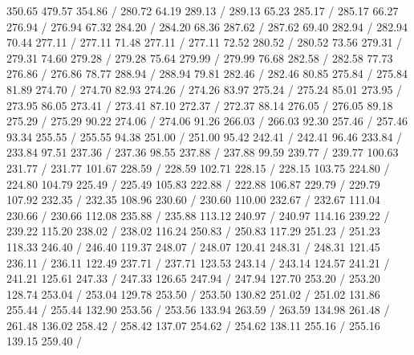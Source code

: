 { 350.65 479.57 354.86 /
\setsolid
{} 280.72 64.19 289.13 /
 289.13 65.23 285.17 /
 285.17 66.27 276.94 /
 276.94 67.32 284.20 /
 284.20 68.36 287.62 /
 287.62 69.40 282.94 /
 282.94 70.44 277.11 /
 277.11 71.48 277.11 /
 277.11 72.52 280.52 /
 280.52 73.56 279.31 /
 279.31 74.60 279.28 /
 279.28 75.64 279.99 /
 279.99 76.68 282.58 /
 282.58 77.73 276.86 /
 276.86 78.77 288.94 /
 288.94 79.81 282.46 /
 282.46 80.85 275.84 /
 275.84 81.89 274.70 /
 274.70 82.93 274.26 /
 274.26 83.97 275.24 /
 275.24 85.01 273.95 /
 273.95 86.05 273.41 /
 273.41 87.10 272.37 /
 272.37 88.14 276.05 /
 276.05 89.18 275.29 /
 275.29 90.22 274.06 /
 274.06 91.26 266.03 /
 266.03 92.30 257.46 /
 257.46 93.34 255.55 /
 255.55 94.38 251.00 /
 251.00 95.42 242.41 /
 242.41 96.46 233.84 /
 233.84 97.51 237.36 /
 237.36 98.55 237.88 /
 237.88 99.59 239.77 /
 239.77 100.63 231.77 /
 231.77 101.67 228.59 /
 228.59 102.71 228.15 /
 228.15 103.75 224.80 /
 224.80 104.79 225.49 /
 225.49 105.83 222.88 /
 222.88 106.87 229.79 /
 229.79 107.92 232.35 /
 232.35 108.96 230.60 /
 230.60 110.00 232.67 /
 232.67 111.04 230.66 /
 230.66 112.08 235.88 /
 235.88 113.12 240.97 /
 240.97 114.16 239.22 /
 239.22 115.20 238.02 /
 238.02 116.24 250.83 /
 250.83 117.29 251.23 /
 251.23 118.33 246.40 /
 246.40 119.37 248.07 /
 248.07 120.41 248.31 /
 248.31 121.45 236.11 /
 236.11 122.49 237.71 /
 237.71 123.53 243.14 /
 243.14 124.57 241.21 /
 241.21 125.61 247.33 /
 247.33 126.65 247.94 /
 247.94 127.70 253.20 /
 253.20 128.74 253.04 /
 253.04 129.78 253.50 /
 253.50 130.82 251.02 /
 251.02 131.86 255.44 /
 255.44 132.90 253.56 /
 253.56 133.94 263.59 /
 263.59 134.98 261.48 /
 261.48 136.02 258.42 /
 258.42 137.07 254.62 /
 254.62 138.11 255.16 /
 255.16 139.15 259.40 /
}

